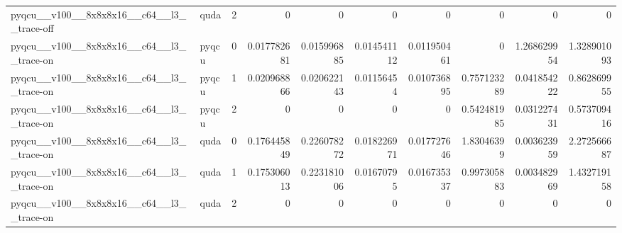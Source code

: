 \begin{table}[htbp]
\begin{tabular}{@{}llrrrrrrrr@{}}
pyqcu\_\_v100\_\_8x8x8x16\_\_c64\_\_l3\_\_trace-off & quda & 2 & 0 & 0 & 0 & 0 & 0 & 0 & 0 \\
pyqcu\_\_v100\_\_8x8x8x16\_\_c64\_\_l3\_\_trace-on & pyqcu & 0 & 0.017782681 & 0.015996885 & 0.014541112 & 0.011950461 & 0 & 1.268629954 & 1.328901093 \\
pyqcu\_\_v100\_\_8x8x8x16\_\_c64\_\_l3\_\_trace-on & pyqcu & 1 & 0.020968866 & 0.020622143 & 0.01156454 & 0.010736895 & 0.757123289 & 0.041854222 & 0.862869955 \\
pyqcu\_\_v100\_\_8x8x8x16\_\_c64\_\_l3\_\_trace-on & pyqcu & 2 & 0 & 0 & 0 & 0 & 0.542481985 & 0.031227431 & 0.573709416 \\
pyqcu\_\_v100\_\_8x8x8x16\_\_c64\_\_l3\_\_trace-on & quda & 0 & 0.176445849 & 0.226078272 & 0.018226971 & 0.017727646 & 1.83046399 & 0.003623959 & 2.272566687 \\
pyqcu\_\_v100\_\_8x8x8x16\_\_c64\_\_l3\_\_trace-on & quda & 1 & 0.175306013 & 0.223181006 & 0.01670795 & 0.016735337 & 0.997305883 & 0.003482969 & 1.432719158 \\
pyqcu\_\_v100\_\_8x8x8x16\_\_c64\_\_l3\_\_trace-on & quda & 2 & 0 & 0 & 0 & 0 & 0 & 0 & 0 \\
\bottomrule
\end{tabular}
\end{table}

